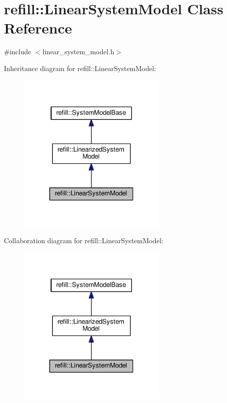 \hypertarget{classrefill_1_1LinearSystemModel}{}\section{refill\+:\+:Linear\+System\+Model Class Reference}
\label{classrefill_1_1LinearSystemModel}


{\ttfamily \#include $<$linear\+\_\+system\+\_\+model.\+h$>$}



Inheritance diagram for refill\+:\+:Linear\+System\+Model\+:\nopagebreak
\begin{figure}[H]
\begin{center}
\leavevmode
\includegraphics[width=207pt]{classrefill_1_1LinearSystemModel__inherit__graph}
\end{center}
\end{figure}


Collaboration diagram for refill\+:\+:Linear\+System\+Model\+:\nopagebreak
\begin{figure}[H]
\begin{center}
\leavevmode
\includegraphics[width=207pt]{classrefill_1_1LinearSystemModel__coll__graph}
\end{center}
\end{figure}

